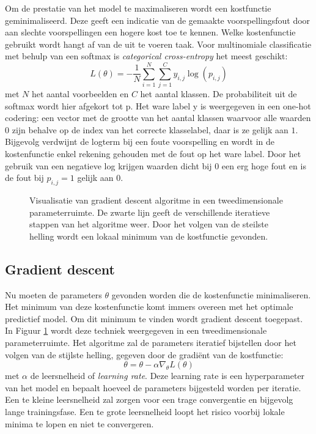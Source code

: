 \npar Om de prestatie van het model te maximaliseren wordt een kostfunctie geminimaliseerd. Deze geeft een indicatie van de gemaakte voorspellingsfout door aan slechte voorspellingen een hogere kost toe te kennen. Welke kostenfunctie gebruikt wordt hangt af van de uit te voeren taak. Voor multinomiale classificatie met behulp van een softmax is \textit{categorical cross-entropy} het meest geschikt:
\begin{equation}
L(\theta) = - \frac{1}{N}\sum_{i=1}^{N}\sum_{j=1}^{C}y_{i,j}\log(p_{i,j})
\end{equation}
met $N$ het aantal voorbeelden en $C$ het aantal klassen. De probabiliteit uit de softmax wordt hier afgekort tot p. Het ware label y is weergegeven in een one-hot codering: een vector met de grootte van het aantal klassen waarvoor alle waarden $0$ zijn behalve op de index van het correcte klasselabel, daar is ze gelijk aan $1$. Bijgevolg verdwijnt de logterm bij een foute voorspelling en wordt in de kostenfunctie enkel rekening gehouden met de fout op het ware label. Door het gebruik van een negatieve log krijgen waarden dicht bij $0$ een erg hoge fout en is de fout bij $p_{i,j}=1$ gelijk aan $0$. 
\begin{figure}[!t]
	\centering
	\def\svgwidth{0.6\columnwidth}
	
	\caption{Visualisatie van gradient descent algoritme in een tweedimensionale parameterruimte. De zwarte lijn geeft de verschillende iteratieve stappen van het algoritme weer. Door het volgen van de steilste helling wordt een lokaal minimum van de kostfunctie gevonden.}
	\label{fig:gradient-descent}
\end{figure}
\subsection{Gradient descent}
\npar Nu moeten de parameters $\theta$ gevonden worden die de kostenfunctie minimaliseren. Het minimum van deze kostenfunctie komt immers overeen met het optimale predictief model. Om dit minimum te vinden wordt gradient descent toegepast. In Figuur \ref{fig:gradient-descent} wordt deze techniek weergegeven in een tweedimensionale parameterruimte. Het algoritme zal de parameters iteratief bijstellen door het volgen van de stijlste helling, gegeven door de gradi\"ent van de kostfunctie:
\begin{equation}\label{eq:grad-desc}
\theta = \theta - \alpha \nabla_\theta L(\theta)
\end{equation}
met $\alpha$ de leersnelheid of \textit{learning rate}. Deze learning rate is een hyperparameter van het model en bepaalt hoeveel de parameters bijgesteld worden per iteratie. Een te kleine leersnelheid zal zorgen voor een trage convergentie en bijgevolg lange trainingsfase. Een te grote leersnelheid loopt het risico voorbij lokale minima te lopen en niet te convergeren.

